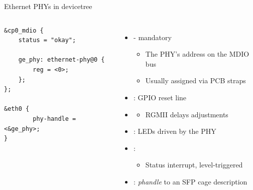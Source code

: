 \begin{frame}[fragile]{Ethernet PHYs in devicetree}
	\begin{columns}
		\begin{block}{}
		{\fontsize{9}{10}
			\begin{verbatim}
&cp0_mdio {
    status = "okay";
    
    ge_phy: ethernet-phy@0 {
        reg = <0>;
    };
};

&eth0 {
        phy-handle = <&ge_phy>;
}
			\end{verbatim}
		}
		\end{block}
		\begin{itemize}
			\item {} - mandatory
				\begin{itemize}
					\item The PHY's address on the MDIO bus
					\item Usually assigned via PCB straps
				\end{itemize}
			\item {} : GPIO reset line
			\item {}
				\begin{itemize}
					\item RGMII delays adjustments
				\end{itemize}
			\item {} : LEDs driven by the PHY
			\item {} :
				\begin{itemize}
					\item Status interrupt, level-triggered
				\end{itemize}
			\item {} : \textit{phandle} to an SFP cage description
		\end{itemize}
	\end{columns}

\end{frame}

